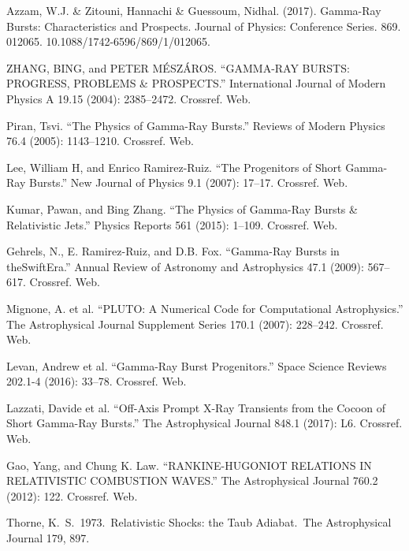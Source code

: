 \documentclass[12pt,a4paper]{book}
\begin{document}
\begin{thebibliography}{20}
    Azzam, W.J. \& Zitouni, Hannachi \& Guessoum, Nidhal. (2017). Gamma-Ray Bursts: Characteristics and Prospects. Journal of Physics: Conference Series. 869. 012065. 10.1088/1742-6596/869/1/012065. 
    
    ZHANG, BING, and PETER MÉSZÁROS. “GAMMA-RAY BURSTS: PROGRESS, PROBLEMS \& PROSPECTS.” International Journal of Modern Physics A 19.15 (2004): 2385–2472. Crossref. Web.
    
    Piran, Tsvi. “The Physics of Gamma-Ray Bursts.” Reviews of Modern Physics 76.4 (2005): 1143–1210. Crossref. Web.
    
    Lee, William H, and Enrico Ramirez-Ruiz. “The Progenitors of Short Gamma-Ray Bursts.” New Journal of Physics 9.1 (2007): 17–17. Crossref. Web.
    
    Kumar, Pawan, and Bing Zhang. “The Physics of Gamma-Ray Bursts \& Relativistic Jets.” Physics Reports 561 (2015): 1–109. Crossref. Web.
    
    Gehrels, N., E. Ramirez-Ruiz, and D.B. Fox. “Gamma-Ray Bursts in theSwiftEra.” Annual Review of Astronomy and Astrophysics 47.1 (2009): 567–617. Crossref. Web.
    
    Mignone, A. et al. “PLUTO: A Numerical Code for Computational Astrophysics.” The Astrophysical Journal Supplement Series 170.1 (2007): 228–242. Crossref. Web.
    
    Levan, Andrew et al. “Gamma-Ray Burst Progenitors.” Space Science Reviews 202.1-4 (2016): 33–78. Crossref. Web.
    
    Lazzati, Davide et al. “Off-Axis Prompt X-Ray Transients from the Cocoon of Short Gamma-Ray Bursts.” The Astrophysical Journal 848.1 (2017): L6. Crossref. Web.
    
    Gao, Yang, and Chung K. Law. “RANKINE-HUGONIOT RELATIONS IN RELATIVISTIC COMBUSTION WAVES.” The Astrophysical Journal 760.2 (2012): 122. Crossref. Web.
    
     Thorne, K.~S.\ 1973.\ Relativistic Shocks: the Taub Adiabat.\ The Astrophysical Journal 179, 897.
    

\end{thebibliography}
\end{document}
